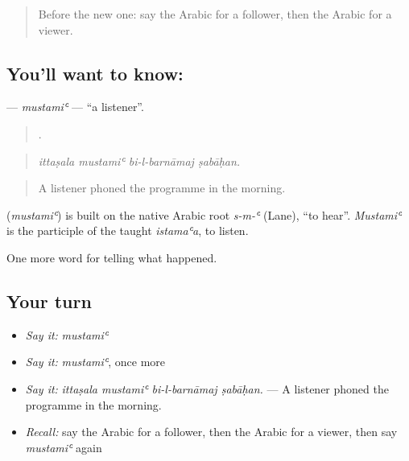 \label{lesson:AR-C356-mustami}



\begin{quote}
Before the new one: say the Arabic for a follower, then the Arabic for a viewer.
\end{quote}

\subsection*{You'll want to know: }
\textbf{} — \emph{mustamiʿ} — \textquotedblleft{}a listener\textquotedblright{}.

\begin{quote}
   .
\end{quote}

\begin{quote}
\emph{ittaṣala mustamiʿ bi-l-barnāmaj ṣabāḥan.}
\end{quote}

\begin{quote}
A listener phoned the programme in the morning.
\end{quote}

\begin{cousinweb}
\textbf{} (\emph{mustamiʿ}) is built on the native Arabic root \emph{s-m-ʿ} (Lane), \textquotedblleft{}to hear\textquotedblright{}. \emph{Mustamiʿ} is the participle of the taught \emph{istamaʿa}, to listen.
\end{cousinweb}

\begin{grammarlens}[title={What you've built}]
One more word for telling what happened.
\end{grammarlens}

\subsection*{Your turn}
\begin{itemize}
\raggedright
  \item \emph{Say it:} \emph{mustamiʿ}
  \item \emph{Say it:} \emph{mustamiʿ}, once more
  \item \emph{Say it:} \emph{ittaṣala mustamiʿ bi-l-barnāmaj ṣabāḥan.} — A listener phoned the programme in the morning.
  \item \emph{Recall:} say the Arabic for a follower, then the Arabic for a viewer, then say \emph{mustamiʿ} again
\end{itemize}

